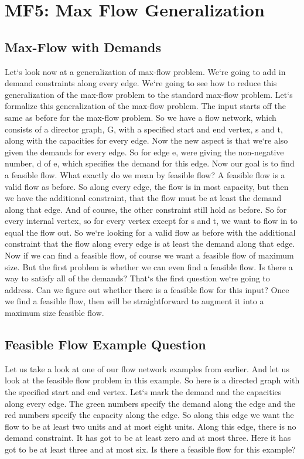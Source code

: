 \section{MF5: Max Flow Generalization}

\subsection{Max-Flow with Demands}
Let`s look now at a generalization of max-flow problem.
We`re going to add in demand constraints along every edge.
We`re going to see how to reduce this generalization of the max-flow problem to the standard max-flow problem.
Let`s formalize this generalization of the max-flow problem.
The input starts off the same as before for the max-flow problem.
So we have a flow network, which consists of a director graph, G, with a specified start and end vertex, s and t, along with the capacities for every edge.
Now the new aspect is that we`re also given the demands for every edge.
So for edge e, were giving the non-negative number, d of e, which specifies the demand for this edge.
Now our goal is to find a feasible flow.
What exactly do we mean by feasible flow? A feasible flow is a valid flow as before.
So along every edge, the flow is in most capacity, but then we have the additional constraint, that the flow must be at least the demand along that edge.
And of course, the other constraint still hold as before.
So for every internal vertex, so for every vertex except for s and t, we want to flow in to equal the flow out.
So we`re looking for a valid flow as before with the additional constraint that the flow along every edge is at least the demand along that edge.
Now if we can find a feasible flow, of course we want a feasible flow of maximum size.
But the first problem is whether we can even find a feasible flow.
Is there a way to satisfy all of the demands? That`s the first question we`re going to address.
Can we figure out whether there is a feasible flow for this input? Once we find a feasible flow, then will be straightforward to augment it into a maximum size feasible flow.

\subsection{Feasible Flow Example Question}
Let us take a look at one of our flow network examples from earlier.
And let us look at the feasible flow problem in this example.
So here is a directed graph with the specified start and end vertex.
Let`s mark the demand and the capacities along every edge.
The green numbers specify the demand along the edge and the red numbers specify the capacity along the edge.
So along this edge we want the flow to be at least two units and at most eight units.
Along this edge, there is no demand constraint.
It has got to be at least zero and at most three.
Here it has got to be at least three and at most six.
Is there a feasible flow for this example?

